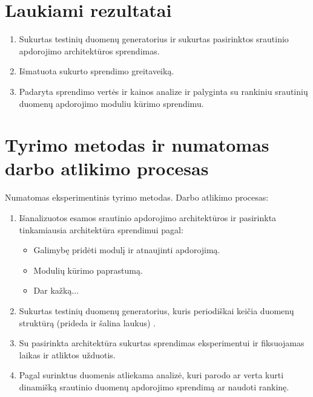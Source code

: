 \documentclass{VUMIFPSbakalaurinis}
\begin{document}
\section{Laukiami rezultatai}
    \begin{enumerate}
        \item Sukurtas testinių duomenų generatorius ir sukurtas pasirinktos srautinio apdorojimo architektūros sprendimas.
        \item Išmatuota sukurto sprendimo greitaveiką.
        \item Padaryta sprendimo vertės ir kainos analize ir palyginta su rankiniu srautinių duomenų apdorojimo moduliu kūrimo sprendimu. 
    \end{enumerate}
    \vspace{1 mm}
\section{Tyrimo metodas ir numatomas darbo atlikimo procesas}
Numatomas eksperimentinis tyrimo metodas.
Darbo atlikimo procesas:
\begin{enumerate}
    \item Išanalizuotos esamos srautinio apdorojimo architektūros ir pasirinkta tinkamiausia architektūra sprendimui pagal:
    	\begin{itemize}
		\item Galimybę pridėti modulį ir atnaujinti apdorojimą.
		\item Modulių kūrimo paprastumą.
		\item Dar kažką...
	\end{itemize}
    \item Sukurtas testinių duomenų generatorius, kuris periodiškai keičia duomenų struktūrą (prideda ir šalina laukus) .
    \item Su pasirinkta architektūra sukurtas sprendimas eksperimentui ir fiksuojamas laikas ir atliktos užduotis.
    \item Pagal surinktus duomenis atliekama analizė, kuri parodo ar verta kurti dinamišką srautinio duomenų apdorojimo sprendimą 
    ar naudoti rankinę.  
\end{enumerate}
\end{document}
